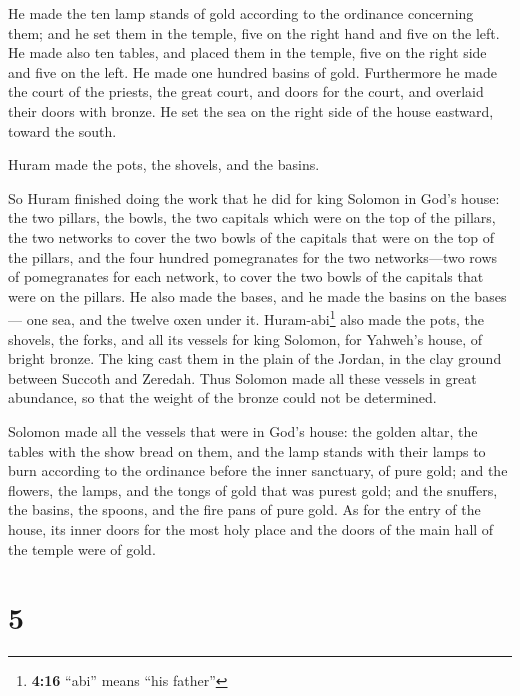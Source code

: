  He made the ten lamp stands of gold according to the
ordinance concerning them; and he set them in the temple, five on the
right hand and five on the left.  He made also ten tables,
and placed them in the temple, five on the right side and five on the
left. He made one hundred basins of gold.  Furthermore he
made the court of the priests, the great court, and doors for the court,
and overlaid their doors with bronze.  He set the sea on
the right side of the house eastward, toward the south.

 Huram made the pots, the shovels, and the basins.

So Huram finished doing the work that he did for king Solomon in God's
house:  the two pillars, the bowls, the two capitals
which were on the top of the pillars, the two networks to cover the two
bowls of the capitals that were on the top of the pillars,
 and the four hundred pomegranates for the two
networks---two rows of pomegranates for each network, to cover the two
bowls of the capitals that were on the pillars.  He also
made the bases, and he made the basins on the bases--- 
one sea, and the twelve oxen under it. 
Huram-abi\footnote{\textbf{4:16} ``abi'' means ``his father''} also made
the pots, the shovels, the forks, and all its vessels for king Solomon,
for Yahweh's house, of bright bronze.  The king cast them
in the plain of the Jordan, in the clay ground between Succoth and
Zeredah.  Thus Solomon made all these vessels in great
abundance, so that the weight of the bronze could not be determined.

 Solomon made all the vessels that were in God's house:
the golden altar, the tables with the show bread on them,
 and the lamp stands with their lamps to burn according
to the ordinance before the inner sanctuary, of pure gold;
 and the flowers, the lamps, and the tongs of gold that
was purest gold;  and the snuffers, the basins, the
spoons, and the fire pans of pure gold. As for the entry of the house,
its inner doors for the most holy place and the doors of the main hall
of the temple were of gold.

\hypertarget{section-4}{%
\section{5}\label{section-4}}

